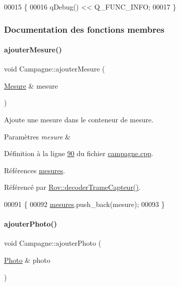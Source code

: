 \begin{DoxyCode}
00015 \{
00016     qDebug() << Q\_FUNC\_INFO;
00017 \}
\end{DoxyCode}


\subsubsection{Documentation des fonctions membres}
\mbox{\label{class_campagne_ab301ceaacbe1186682c2b6f3282619d0}} 
\paragraph{\texorpdfstring{ajouter\+Mesure()}{ajouterMesure()}}
{\footnotesize\ttfamily void Campagne\+::ajouter\+Mesure (\begin{DoxyParamCaption}\item[{\hyperlink{struct_mesure}{Mesure} \&}]{mesure }\end{DoxyParamCaption})}



Ajoute une mesure dans le conteneur de mesure. 


\begin{DoxyParams}{Paramètres}
{\em mesure} & \\
\hline
\end{DoxyParams}


Définition à la ligne \hyperlink{campagne_8cpp_source_l00090}{90} du fichier \hyperlink{campagne_8cpp_source}{campagne.\+cpp}.



Références \hyperlink{campagne_8h_source_l00047}{mesures}.



Référencé par \hyperlink{rov_8cpp_source_l00086}{Rov\+::decoder\+Trame\+Capteur()}.


\begin{DoxyCode}
00091 \{
00092     \hyperlink{class_campagne_ac460df42e2fbc12aae7b97abbe219ad0}{mesures}.push\_back(mesure);
00093 \}
\end{DoxyCode}
\mbox{\label{class_campagne_a472029bf46646d136a750dbaa7a3155f}} 
\paragraph{\texorpdfstring{ajouter\+Photo()}{ajouterPhoto()}}
{\footnotesize\ttfamily void Campagne\+::ajouter\+Photo (\begin{DoxyParamCaption}\item[{\hyperlink{struct_photo}{Photo} \&}]{photo }\end{DoxyParamCaption})}



